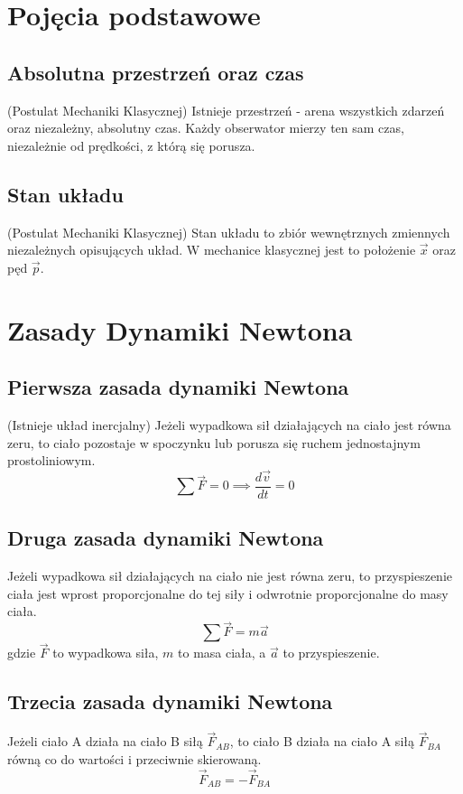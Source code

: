 \documentclass{article}
\theoremstyle{definition}
\theoremstyle{definition}
\theoremstyle{definition}
\theoremstyle{definition}
\begin{document}
\section{Pojęcia podstawowe}
\subsection{Absolutna przestrzeń oraz czas}
(Postulat Mechaniki Klasycznej)
Istnieje przestrzeń - arena wszystkich zdarzeń oraz niezależny, absolutny czas. Każdy obserwator mierzy ten sam czas, niezależnie od prędkości, z którą się porusza.
\subsection{Stan układu}
(Postulat Mechaniki Klasycznej)
Stan układu to zbiór wewnętrznych zmiennych niezależnych opisujących układ. W mechanice klasycznej jest to położenie $\vec{x}$ oraz pęd $\vec{p}$. 
\section{Zasady Dynamiki Newtona}
\subsection*{Pierwsza zasada dynamiki Newtona}
(Istnieje układ inercjalny) Jeżeli wypadkowa sił działających na ciało jest równa zeru, to ciało pozostaje w spoczynku lub porusza się ruchem jednostajnym prostoliniowym.
\begin{equation}
\sum \vec{F} = 0 \implies \frac{d\vec{v}}{dt} = 0
\end{equation}
\subsection*{Druga zasada dynamiki Newtona}
Jeżeli wypadkowa sił działających na ciało nie jest równa zeru, to przyspieszenie ciała jest wprost proporcjonalne do tej siły i odwrotnie proporcjonalne do masy ciała.
\begin{equation}
\sum \vec{F} = m \vec{a}
\end{equation}
gdzie \(\vec{F}\) to wypadkowa siła, \(m\) to masa ciała, a \(\vec{a}\) to przyspieszenie.

\subsection*{Trzecia zasada dynamiki Newtona}
Jeżeli ciało A działa na ciało B siłą \(\vec{F}_{AB}\), to ciało B działa na ciało A siłą \(\vec{F}_{BA}\) równą co do wartości i przeciwnie skierowaną.
\begin{equation}
\vec{F}_{AB} = -\vec{F}_{BA}
\end{equation}
\end{document}
